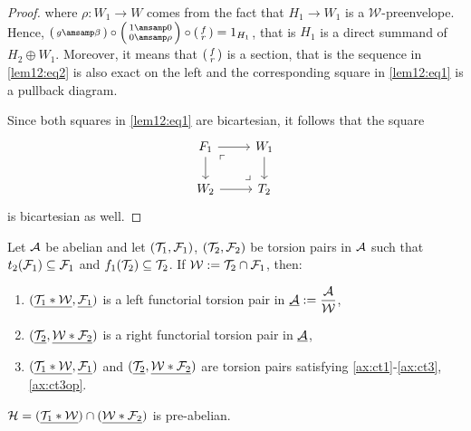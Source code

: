 \begin{proof}
  where $\rho:W_1\to W$ comes from the fact that $H_1\to W_1$ is a $\mathcal{W}$-preenvelope. Hence,
  $
    \begin{psmallmatrix}
      g\amsamp \beta
    \end{psmallmatrix}
    \circ
    \begin{psmallmatrix}
      1 \amsamp 0\\
      0 \amsamp \rho
    \end{psmallmatrix}
    \circ
    \begin{psmallmatrix}
      f \\ r
    \end{psmallmatrix}
    = 1_{H_1}
  $, that is $H_1$ is a direct summand of $H_2\oplus W_1$. Moreover, it means that
  $
    \begin{psmallmatrix}
      f \\ r
    \end{psmallmatrix}
  $ is a section, that is the sequence in \eqref{lem12:eq2} is also exact on the left and
  the corresponding square in \eqref{lem12:eq1} is a pullback diagram.

  Since both squares in \eqref{lem12:eq1} are bicartesian, it follows that the square
  \begin{equation*}
    \begin{tikzcd}
      F_1\arrow{r}\arrow{d}
        \arrow[phantom,"\ulcorner",very near start]{dr}
        \arrow[phantom,"\lrcorner",very near end]{dr}
        & W_1\arrow{d}\\
      W_2\arrow{r}& T_2
    \end{tikzcd}
  \end{equation*}
  is bicartesian as well.
\end{proof}

\begin{prop}
  Let $\mathcal A$ be abelian and let $(\mathcal T_1,\mathcal F_1)$, $(\mathcal T_2,\mathcal F_2)$ be torsion pairs in $\mathcal A$
  such that $t_2(\mathcal F_1)\subseteq \mathcal F_1$ and $f_1(\mathcal T_2)\subseteq \mathcal T_2$. If $\mathcal W:= \mathcal T_2\cap\mathcal F_1$, then:
  \begin{enumerate}
    \item $(\underline{\mathcal T_1\ast\mathcal W},\underline{\mathcal F_1})$ is a left functorial torsion pair in $\underline{\mathcal A}:=\dfrac{\mathcal A}{\mathcal W}$,
    \item $(\underline{\mathcal T_2},\underline{\mathcal W\ast\mathcal F_2})$ is a right functorial torsion pair in $\underline{\mathcal A}$,
    \item $(\underline{\mathcal T_1\ast\mathcal W},\underline{\mathcal F_1})$ and $(\underline{\mathcal T_2},\underline{\mathcal W\ast\mathcal F_2})$ are torsion pairs satisfying \ref{ax:ct1}-\ref{ax:ct3},\ref{ax:ct3op}.
  \end{enumerate}
\end{prop}

\begin{corollary}
  $\mathcal H=(\underline{\mathcal T_1\ast\mathcal W})\cap(\underline{\mathcal W\ast\mathcal F_2})$ is pre-abelian.
\end{corollary}
